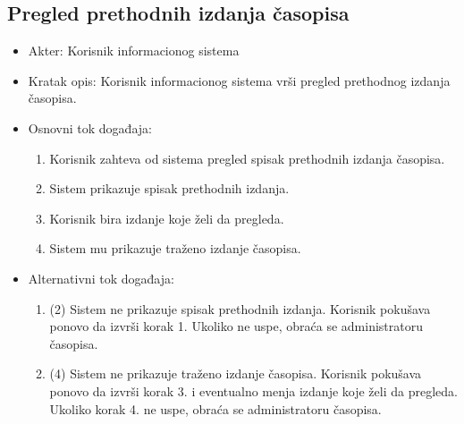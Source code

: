 \documentclass[a4paper]{article}
\begin{document}
\subsection{Pregled prethodnih izdanja časopisa}
\begin{itemize}
    \item Akter: Korisnik informacionog sistema
    \item Kratak opis: Korisnik informacionog sistema vrši pregled prethodnog izdanja časopisa.
    \item Osnovni tok događaja:
        \begin{enumerate}
            \item Korisnik zahteva od sistema pregled spisak prethodnih izdanja časopisa.
            \item Sistem prikazuje spisak prethodnih izdanja.
            \item Korisnik bira izdanje koje želi da pregleda.
            \item Sistem mu prikazuje traženo izdanje časopisa.
        \end{enumerate}
    \item Alternativni tok događaja:
        \begin{enumerate}
            \item  (2) Sistem ne prikazuje spisak prethodnih izdanja. Korisnik pokušava ponovo da izvrši korak 1. Ukoliko ne uspe, obraća se administratoru časopisa.
            \item (4) Sistem ne prikazuje traženo izdanje časopisa. Korisnik pokušava ponovo da izvrši korak 3. i eventualno menja izdanje koje želi da pregleda. Ukoliko korak 4. ne uspe, obraća se administratoru časopisa.
        \end{enumerate}
\end{itemize}
\end{document}
